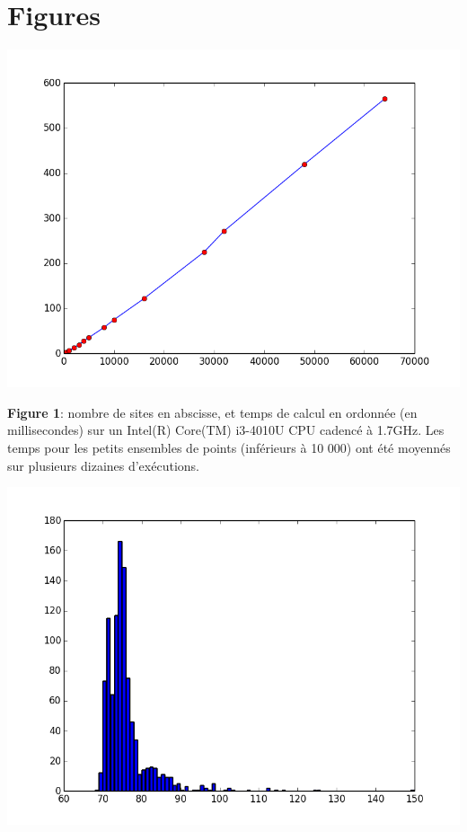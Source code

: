 \documentclass[a4paper, 10pt]{article}
\begin{document}
\section{Figures}  
\begin{center}
\includegraphics[scale=0.4]{PerformancesMilisecondes.png} 
  
\textbf{Figure 1}: nombre de sites en abscisse, et temps de calcul en ordonnée (en millisecondes) sur un Intel(R) Core(TM) i3-4010U CPU cadencé à 1.7GHz. Les temps pour les petits ensembles de points (inférieurs à 10 000) ont été moyennés sur plusieurs dizaines d'exécutions.  
  
\includegraphics[scale=0.4]{PerformancesGaussienne.png}  
  

\end{center}
\end{document}
